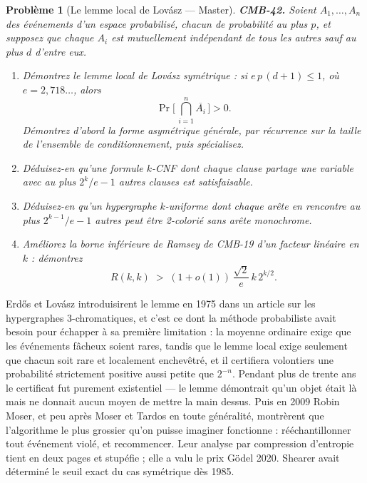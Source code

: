 \documentclass[11pt]{article}
\newtheorem{problem}{Problème}
\begin{document}
\bigskip

\begin{problem}[{Le lemme local de Lovász --- Master}]
\textbf{CMB-42.} Soient $ A_1, \dots, A_n $ des événements d'un espace probabilisé, chacun de probabilité au plus $ p $, et supposez que chaque $ A_i $ est mutuellement indépendant de tous les autres sauf au plus $ d $ d'entre eux.
\begin{enumerate}
\item[(a)] Démontrez le lemme local de Lovász symétrique : si $ e\,p\,(d+1) \le 1 $, où $ e = 2{,}718\ldots $, alors
\[ \Pr\Big[\, \bigcap_{i=1}^{n} \overline{A_i} \,\Big] > 0. \]
Démontrez d'abord la forme asymétrique générale, par récurrence sur la taille de l'ensemble de conditionnement, puis spécialisez.
\item[(b)] Déduisez-en qu'une formule $ k $-CNF dont chaque clause partage une variable avec au plus $ 2^{k}/e - 1 $ autres clauses est satisfaisable.
\item[(c)] Déduisez-en qu'un hypergraphe $ k $-uniforme dont chaque arête en rencontre au plus $ 2^{k-1}/e - 1 $ autres peut être 2-colorié sans arête monochrome.
\item[(d)] Améliorez la borne inférieure de Ramsey de CMB-19 d'un facteur linéaire en $ k $ : démontrez
\[ R(k,k) \;>\; (1+o(1))\,\frac{\sqrt{2}}{e}\, k\, 2^{k/2}. \]
\end{enumerate}

\end{problem}

\noindent Erd\H{o}s et Lovász introduisirent le lemme en 1975 dans un article sur les hypergraphes 3-chromatiques, et c'est ce dont la méthode probabiliste avait besoin pour échapper à sa première limitation : la moyenne ordinaire exige que les événements fâcheux soient rares, tandis que le lemme local exige seulement que chacun soit rare et localement enchevêtré, et il certifiera volontiers une probabilité strictement positive aussi petite que $ 2^{-n} $. Pendant plus de trente ans le certificat fut purement existentiel --- le lemme démontrait qu'un objet était là mais ne donnait aucun moyen de mettre la main dessus. Puis en 2009 Robin Moser, et peu après Moser et Tardos en toute généralité, montrèrent que l'algorithme le plus grossier qu'on puisse imaginer fonctionne : rééchantillonner tout événement violé, et recommencer. Leur analyse par \og{} compression d'entropie \fg{} tient en deux pages et stupéfie ; elle a valu le prix Gödel 2020. Shearer avait déterminé le seuil exact du cas symétrique dès 1985.
\end{document}

